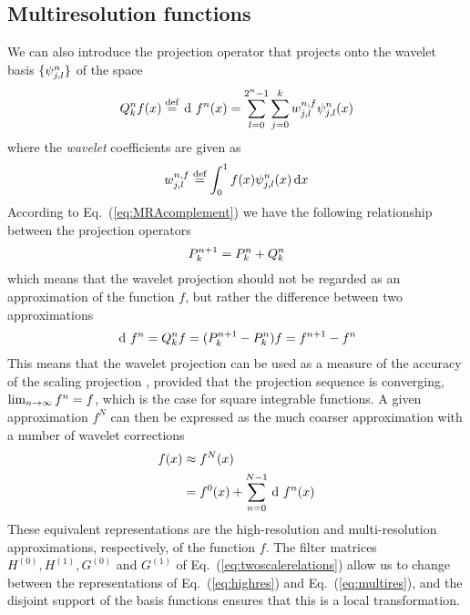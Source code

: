 \subsection{Multiresolution functions}
We can also introduce the projection operator  that projects
onto the wavelet basis $\lbrace\psi^n_{j,l}\rbrace$ of the space 
\begin{equation}
    \label{eq:wavelet_exp}
    \waveletproj{n}f(x) \mydef \waveletrep{f}{n}(x) =
    \sum_{l=0}^{2^n-1}\sum_{j=0}^k\waveletcoef^{n,f}_{j,l}\wavelet^n_{j,l}(x)
\end{equation}
where the \emph{wavelet} coefficients are given as
\begin{equation}
    \label{eq:wavelet_coef}
    w^{n,f}_{j,l} \stackrel{\text{def}}{\hbox{=}} \int_0^1f(x)\psi^n_{j,l}(x)\,\mathrm{d} x
\end{equation}
According to Eq.~(\ref{eq:MRAcomplement}) we have the following relationship 
between the projection operators
\begin{equation}
    \label{eq:proj_rel}
    {P}_{k}^{n+1} = {P}_{k}^{n} + {Q}_{k}^{n}
\end{equation}
which means that the wavelet projection should not be regarded as an approximation 
of the function $f$, but rather the difference between two approximations
\begin{equation}
    \waveletrep{f}{n} = \waveletproj{n} f = (\scalingproj{n+1} - \scalingproj{n}) f = 
	\scalingrep{f}{n+1} - \scalingrep{f}{n}
\end{equation}
This means that the wavelet projection  can be used as a measure of the accuracy 
of the scaling projection , provided that the projection sequence is converging,
$\lim_{n\rightarrow\infty} {f}^{n} = f$, which is the case for square integrable functions.
A given approximation $f^N$ can then be expressed as the much coarser approximation 
with a number of wavelet corrections
\begin{align}
    \label{eq:highres}
    f(x)    &\approx \scalingrep{f}{N}(x)\\
    \label{eq:multires}
	    &= \scalingrep{f}{0}(x) + \sum_{n=0}^{N-1} \waveletrep{f}{n}(x)
\end{align}
These equivalent representations are the high-resolution and multi-resolution 
approximations, respectively, of the function $f$. The filter matrices $H^{(0)}, 
H^{(1)}, G^{(0)}$ and $G^{(1)}$ of Eq.~(\ref{eq:twoscalerelations}) allow us to 
change between the representations of Eq.~(\ref{eq:highres}) and 
Eq.~(\ref{eq:multires}), and the disjoint support of the basis functions ensures 
that this is a local transformation.

